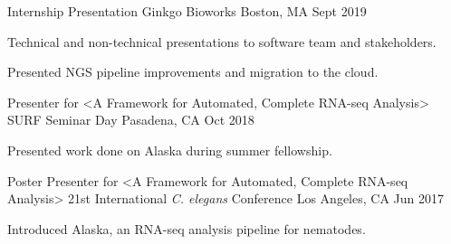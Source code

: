 

\begin{cventries}

\cventry
  {Internship Presentation} %
  {Ginkgo Bioworks} %
  {Boston, MA} %
  {Sept 2019} %
  {
    \begin{cvitems} %
      \item {Technical and non-technical presentations to software team and stakeholders.}
      \item {Presented NGS pipeline improvements and migration to the cloud.}
    \end{cvitems}
  }

  \cventry
    {Presenter for <A Framework for Automated, Complete RNA-seq Analysis>} %
    {SURF Seminar Day} %
    {Pasadena, CA} %
    {Oct 2018} %
    {
      \begin{cvitems} %
        \item {Presented work done on Alaska during summer fellowship.}
      \end{cvitems}
    }


  \cventry
    {Poster Presenter for <A Framework for Automated, Complete RNA-seq Analysis>} %
    {21st International \textit{C. elegans} Conference} %
    {Los Angeles, CA} %
    {Jun 2017} %
    {
      \begin{cvitems} %
        \item {Introduced Alaska, an RNA-seq analysis pipeline for nematodes.}
      \end{cvitems}
    }

\end{cventries}
